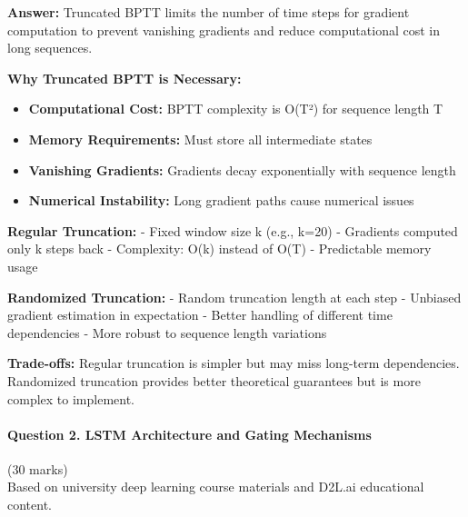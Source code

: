\documentclass[12pt]{article}
\newcommand{\answer}[1]{{\color{answercolor}\textbf{Answer:} #1}}
\newcommand{\explanation}[1]{{\color{explanationcolor}#1}}
\begin{document}
\begin{enumerate}[(a)]
    \answer{Truncated BPTT limits the number of time steps for gradient computation to prevent vanishing gradients and reduce computational cost in long sequences.}
    
    \explanation{
    \textbf{Why Truncated BPTT is Necessary:}
    \begin{itemize}
        \item \textbf{Computational Cost:} BPTT complexity is O(T²) for sequence length T
        \item \textbf{Memory Requirements:} Must store all intermediate states
        \item \textbf{Vanishing Gradients:} Gradients decay exponentially with sequence length
        \item \textbf{Numerical Instability:} Long gradient paths cause numerical issues
    \end{itemize}
    
    \textbf{Regular Truncation:}
    - Fixed window size k (e.g., k=20)
    - Gradients computed only k steps back
    - Complexity: O(k) instead of O(T)
    - Predictable memory usage
    
    \textbf{Randomized Truncation:}
    - Random truncation length at each step
    - Unbiased gradient estimation in expectation
    - Better handling of different time dependencies
    - More robust to sequence length variations
    
    \textbf{Trade-offs:}
    Regular truncation is simpler but may miss long-term dependencies. Randomized truncation provides better theoretical guarantees but is more complex to implement.
    }
\end{enumerate}

\newpage
\paragraph{Question 2. LSTM Architecture and Gating Mechanisms}\hfill (30 marks)\\
Based on university deep learning course materials and D2L.ai educational content.
\end{document}
